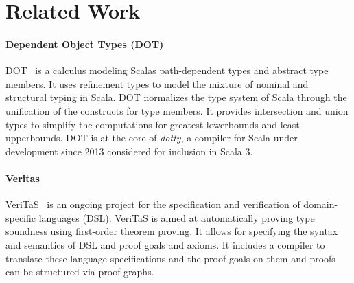 \chapter{Related Work}
\label{chp:related}

\subsubsection{Dependent Object Types (DOT)}
DOT~\cite{dot1,dot2} is a calculus
modeling Scalas path-dependent types and abstract type members.
It uses refinement types to model the mixture of
nominal and structural typing in Scala.
DOT normalizes the type system of Scala
through the unification of the constructs for type members.
It provides intersection and union types
to simplify the computations for greatest lowerbounds
and least upperbounds.
DOT is at the core of \textit{dotty},
a compiler for Scala under development since 2013
considered for inclusion in Scala 3.

\subsubsection{Veritas}
VeriTaS~\cite{veritas1,veritas2} is an ongoing project
for the specification and verification
of domain-specific languages (DSL).
VeriTaS is aimed at automatically proving type soundness 
using first-order theorem proving.
It allows for specifying
the syntax and semantics of DSL
and proof goals and axioms.
It includes a compiler to translate
these language specifications and the proof goals on them
and proofs can be structured via proof graphs.


